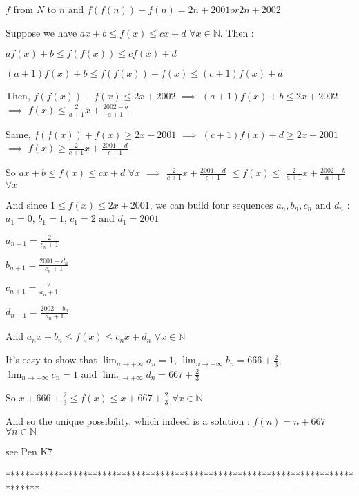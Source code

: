 \begin{solution}
	\begin{tcolorbox}$ f$ from $ N$ to $ n$ and $ f(f(n)) + f(n) = 2n + 2001 or 2n + 2002$\end{tcolorbox}

Suppose we have $ ax + b\le f(x)\le cx + d$ $ \forall x\in\mathbb N$. Then :

$ af(x) + b\le f(f(x))\le cf(x) + d$

$ (a + 1)f(x) + b\le f(f(x)) + f(x)\le (c + 1)f(x) + d$

Then, $ f(f(x)) + f(x)\le 2x + 2002$ $ \implies$ $ (a + 1)f(x) + b\le 2x + 2002$ $ \implies$ $ f(x)\le \frac {2}{a + 1}x + \frac {2002 - b}{a + 1}$

Same, $ f(f(x)) + f(x)\ge 2x + 2001$ $ \implies$ $ (c + 1)f(x) + d\ge 2x + 2001$ $ \implies$ $ f(x)\ge \frac {2}{c + 1}x + \frac {2001 - d}{c + 1}$

So $ ax + b\le f(x)\le cx + d$ $ \forall x$ $ \implies$ $ \frac {2}{c + 1}x + \frac {2001 - d}{c + 1}$ $ \le f(x)\le$ $ \frac {2}{a + 1}x + \frac {2002 - b}{a + 1}$ $ \forall x$

And since $ 1\le f(x)\le 2x + 2001$, we can build four sequences $ a_n,b_n,c_n$ and $ d_n$ :
$ a_1 = 0$, $ b_1 = 1$, $ c_1 = 2$ and $ d_1 = 2001$

$ a_{n + 1} = \frac {2}{c_n + 1}$

$ b_{n + 1} = \frac {2001 - d_n}{c_n + 1}$

$ c_{n + 1} = \frac {2}{a_n + 1}$

$ d_{n + 1} = \frac {2002 - b_n}{a_n + 1}$

And $ a_nx + b_n\le f(x)\le c_nx + d_n$ $ \forall x\in\mathbb N$

It's easy to show that $ \lim_{n\to + \infty}a_n = 1$, $ \lim_{n\to + \infty}b_n = 666 + \frac 23$, $ \lim_{n\to + \infty}c_n = 1$ and $ \lim_{n\to + \infty}d_n = 667 + \frac 23$

So $ x + 666 + \frac 23\le f(x)\le x + 667 + \frac 23$ $ \forall x\in\mathbb N$

And so the unique possibility, which indeed is a solution : $ \boxed{f(n) = n + 667}$ $ \forall n\in\mathbb N$
\end{solution}



\begin{solution}
	see Pen K7
\end{solution}
*******************************************************************************
-------------------------------------------------------------------------------

